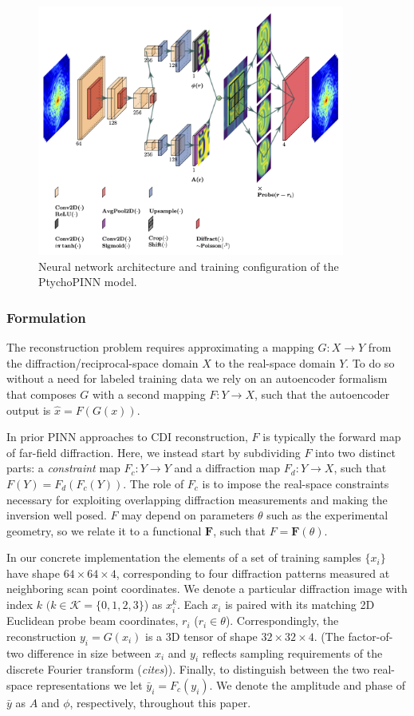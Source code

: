 \documentclass[sn-mathphys]{sn-jnl}%
\theoremstyle{thmstyleone}%
\theoremstyle{thmstyletwo}%
\theoremstyle{thmstylethree}%
\begin{document}
\begin{figure}[h]%
\centering
\includegraphics[width=0.9\textwidth]{figures/lett.png}
\caption{Neural network architecture and training configuration of the PtychoPINN model.}\label{diagram}
\end{figure}


\subsubsection{Formulation}
The reconstruction problem requires approximating a mapping $G: X \rightarrow Y$ from the diffraction/reciprocal-space domain $X$ to the real-space domain $Y$. 
To do so without a need for labeled training data we rely on an autoencoder formalism that composes $G$ with a second mapping $F: Y \rightarrow X$, such that the autoencoder output is $\hat{x} = F(G(x))$. 

In prior PINN approaches to CDI reconstruction, $F$ is typically the forward map of far-field diffraction. Here, we instead start by subdividing $F$ into two distinct parts: a \emph{constraint} map $ F_c: Y \rightarrow Y$ and a diffraction map $ F_d: Y \rightarrow X$, such that $F(Y) = F_d(F_c(Y))$. The role of $F_c$ is to impose the real-space constraints necessary for exploiting overlapping diffraction measurements and making the inversion well posed. $F$ may depend on parameters $\theta$ such as the experimental geometry, so we relate it to a functional $\mathbf{F}$, such that $F = \mathbf{F}(\theta)$.

In our concrete implementation the elements of a set of training samples $\{x_i\}$ have shape $64 \times 64 \times 4$, corresponding to four diffraction patterns measured at neighboring scan point coordinates. We denote a particular diffraction image with index $k$ $(k \in \mathcal{K} = \{0, 1, 2, 3\}$) as $x_i^k$. Each $x_i$ is paired with its matching 2D Euclidean probe beam coordinates, $r_i$ ($r_i \in \theta$). Correspondingly, the reconstruction $y_i = G(x_i)$ is a 3D tensor of shape $32 \times 32 \times 4$. (The factor-of-two difference in size between $x_i$ and $y_i$ reflects sampling requirements of the discrete Fourier transform (\emph{cites})). Finally, to distinguish between the two real-space representations we let $\bar{y}_i = F_c(y_i)$. We denote the amplitude and phase of $\bar{y}$ as $A$ and $\phi$, respectively, throughout this paper.
\end{document}
